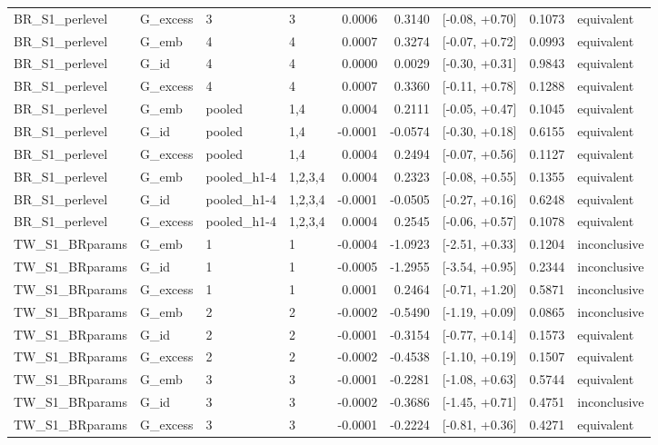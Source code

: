 \begin{tabular}{llllrrlrl}
BR\_S1\_perlevel & G\_excess & 3 & 3 & 0.0006 & 0.3140 & [-0.08, +0.70] & 0.1073 & equivalent \\
BR\_S1\_perlevel & G\_emb & 4 & 4 & 0.0007 & 0.3274 & [-0.07, +0.72] & 0.0993 & equivalent \\
BR\_S1\_perlevel & G\_id & 4 & 4 & 0.0000 & 0.0029 & [-0.30, +0.31] & 0.9843 & equivalent \\
BR\_S1\_perlevel & G\_excess & 4 & 4 & 0.0007 & 0.3360 & [-0.11, +0.78] & 0.1288 & equivalent \\
BR\_S1\_perlevel & G\_emb & pooled & 1,4 & 0.0004 & 0.2111 & [-0.05, +0.47] & 0.1045 & equivalent \\
BR\_S1\_perlevel & G\_id & pooled & 1,4 & -0.0001 & -0.0574 & [-0.30, +0.18] & 0.6155 & equivalent \\
BR\_S1\_perlevel & G\_excess & pooled & 1,4 & 0.0004 & 0.2494 & [-0.07, +0.56] & 0.1127 & equivalent \\
BR\_S1\_perlevel & G\_emb & pooled\_h1-4 & 1,2,3,4 & 0.0004 & 0.2323 & [-0.08, +0.55] & 0.1355 & equivalent \\
BR\_S1\_perlevel & G\_id & pooled\_h1-4 & 1,2,3,4 & -0.0001 & -0.0505 & [-0.27, +0.16] & 0.6248 & equivalent \\
BR\_S1\_perlevel & G\_excess & pooled\_h1-4 & 1,2,3,4 & 0.0004 & 0.2545 & [-0.06, +0.57] & 0.1078 & equivalent \\
TW\_S1\_BRparams & G\_emb & 1 & 1 & -0.0004 & -1.0923 & [-2.51, +0.33] & 0.1204 & inconclusive \\
TW\_S1\_BRparams & G\_id & 1 & 1 & -0.0005 & -1.2955 & [-3.54, +0.95] & 0.2344 & inconclusive \\
TW\_S1\_BRparams & G\_excess & 1 & 1 & 0.0001 & 0.2464 & [-0.71, +1.20] & 0.5871 & inconclusive \\
TW\_S1\_BRparams & G\_emb & 2 & 2 & -0.0002 & -0.5490 & [-1.19, +0.09] & 0.0865 & inconclusive \\
TW\_S1\_BRparams & G\_id & 2 & 2 & -0.0001 & -0.3154 & [-0.77, +0.14] & 0.1573 & equivalent \\
TW\_S1\_BRparams & G\_excess & 2 & 2 & -0.0002 & -0.4538 & [-1.10, +0.19] & 0.1507 & equivalent \\
TW\_S1\_BRparams & G\_emb & 3 & 3 & -0.0001 & -0.2281 & [-1.08, +0.63] & 0.5744 & equivalent \\
TW\_S1\_BRparams & G\_id & 3 & 3 & -0.0002 & -0.3686 & [-1.45, +0.71] & 0.4751 & inconclusive \\
TW\_S1\_BRparams & G\_excess & 3 & 3 & -0.0001 & -0.2224 & [-0.81, +0.36] & 0.4271 & equivalent \\

\end{tabular}
